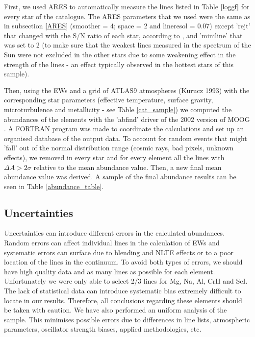 \documentclass[dvips,12pt,a4paper]{report}
\begin{document}
{{First, we used ARES to automatically measure the lines listed in Table \ref{loggf} for every star of the catalogue. The ARES parameters that we used were the same as in subsection \ref{ARES} (smoother = 4; space = 2 and lineresol = 0.07) except 'rejt' that changed with the S/N ratio of each star, according to \citet{Sousa-2008}, and 'miniline' that was set to 2 (to make sure that the weakest lines measured in the spectrum of the Sun were not excluded in the other stars due to some weakening effect in the strength of the lines - an effect typically observed in the hottest stars of this sample).

Then, using the EWs and a grid of ATLAS9 atmospheres (Kurucz 1993) with the corresponding star parameters (effective temperature, surface gravity, microturbulence and metallicity - see Table \ref{cat_sample}) we computed the abundances of the elements with the 'abfind' driver of the 2002 version of MOOG \citep{Sneden-1973}. A FORTRAN program was made to coordinate the calculations and set up an organised database of the output data. To account for random events that might 'fall' out of the normal distribution range (cosmic rays, bad pixels, unknown effects), we removed in every star and for every element all the lines with $\Delta A>2\sigma$ relative to the mean abundance value. Then, a new final mean abundance value was derived. A sample of the final abundance results can be seen in Table \ref{abundance_table}.

\subsection {Uncertainties}
\label{uncertain}
Uncertainties can introduce different errors in the calculated abundances. Random errors can affect individual lines in the calculation of EWs and systematic errors can surface due to blending and NLTE effects or to a poor location of the lines in the continuum. To avoid both types of errors, we should have high quality data and as many lines as possible for each element. Unfortunately we were only able to select 2/3 lines for Mg, Na, Al, CrII and ScI. The lack of statistical data can introduce systematic bias extremely difficult to locate in our results. Therefore, all conclusions regarding these elements should be taken with caution. We have also performed an uniform analysis of the sample. This minimises possible errors due to differences in line lists, atmospheric parameters, oscillator strength biases, applied methodologies, etc.

}}
\end{document}
